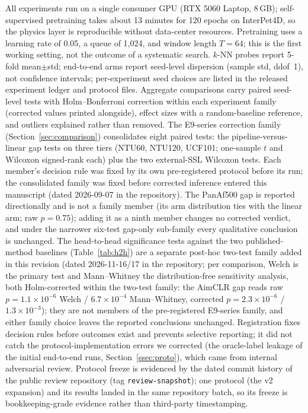 All experiments run on a single consumer GPU (RTX 5060 Laptop, 8\,GB); self-supervised pretraining takes about 13 minutes for 120 epochs on InterPet4D, so the physics layer is reproducible without data-center resources. Pretraining uses a learning rate of 0.05, a queue of 1{,}024, and window length $T{=}64$; this is the first working setting, not the outcome of a systematic search. $k$-NN probes report 5-fold mean$\pm$std; end-to-end arms report seed-level dispersion (sample std, ddof~1), not confidence intervals; per-experiment seed choices are listed in the released experiment ledger and protocol files. Aggregate comparisons carry paired seed-level tests with Holm--Bonferroni correction within each experiment family (corrected values printed alongside), effect sizes with a random-baseline reference, and outliers explained rather than removed. The E9-series correction family (Section~\ref{sec:comparison}) consolidates eight paired tests: the pipeline-versus-linear gap tests on three tiers (NTU60, NTU120, UCF101; one-sample $t$ and Wilcoxon signed-rank each) plus the two external-SSL Wilcoxon tests. Each member's decision rule was fixed by its own pre-registered protocol before its run; the consolidated family was fixed before corrected inference entered this manuscript (dated 2026-09-07 in the repository). The PanAf500 gap is reported directionally and is not a family member (its arm distribution ties with the linear arm; raw $p=0.75$); adding it as a ninth member changes no corrected verdict, and under the narrower six-test gap-only sub-family every qualitative conclusion is unchanged. The head-to-head significance tests against the two published-method baselines (Table~\ref{tab:h2h}) are a separate post-hoc two-test family added in this revision (dated 2026-11-16/17 in the repository; per comparison, Welch is the primary test and Mann--Whitney the distribution-free sensitivity analysis, both Holm-corrected within the two-test family: the AimCLR gap reads raw $p{=}1.1\times10^{-6}$ Welch / $6.7\times10^{-4}$ Mann--Whitney, corrected $p{=}2.3\times10^{-6}$ / $1.3\times10^{-3}$); they are not members of the pre-registered E9-series family, and either family choice leaves the reported conclusions unchanged. Registration fixes decision rules before outcomes exist and prevents selective reporting; it did not catch the protocol-implementation errors we corrected (the oracle-label leakage of the initial end-to-end runs, Section~\ref{ssec:proto}), which came from internal adversarial review. Protocol freeze is evidenced by the dated commit history of the public review repository (tag \texttt{review-snapshot}); one protocol (the v2 expansion) and its results landed in the same repository batch, so its freeze is bookkeeping-grade evidence rather than third-party timestamping.

